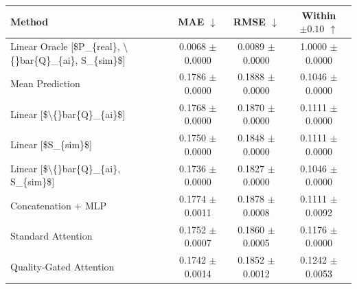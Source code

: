 \begin{tabular}{|l|c|c|c|}
\hline
Method & MAE $\downarrow$ & RMSE $\downarrow$ & Within $\pm 0.10$ $\uparrow$ \\
\hline
Linear Oracle [\$P\_\{real\}, \textbackslash\{\}bar\{Q\}\_\{ai\}, S\_\{sim\}\$] & 0.0068 $\pm$ 0.0000 & 0.0089 $\pm$ 0.0000 & 1.0000 $\pm$ 0.0000 \\
\hline
Mean Prediction & 0.1786 $\pm$ 0.0000 & 0.1888 $\pm$ 0.0000 & 0.1046 $\pm$ 0.0000 \\
\hline
Linear [\$\textbackslash\{\}bar\{Q\}\_\{ai\}\$] & 0.1768 $\pm$ 0.0000 & 0.1870 $\pm$ 0.0000 & 0.1111 $\pm$ 0.0000 \\
\hline
Linear [\$S\_\{sim\}\$] & 0.1750 $\pm$ 0.0000 & 0.1848 $\pm$ 0.0000 & 0.1111 $\pm$ 0.0000 \\
\hline
Linear [\$\textbackslash\{\}bar\{Q\}\_\{ai\}, S\_\{sim\}\$] & 0.1736 $\pm$ 0.0000 & 0.1827 $\pm$ 0.0000 & 0.1046 $\pm$ 0.0000 \\
\hline
Concatenation + MLP & 0.1774 $\pm$ 0.0011 & 0.1878 $\pm$ 0.0008 & 0.1111 $\pm$ 0.0092 \\
\hline
Standard Attention & 0.1752 $\pm$ 0.0007 & 0.1860 $\pm$ 0.0005 & 0.1176 $\pm$ 0.0000 \\
\hline
Quality-Gated Attention & 0.1742 $\pm$ 0.0014 & 0.1852 $\pm$ 0.0012 & 0.1242 $\pm$ 0.0053 \\
\hline
\end{tabular}